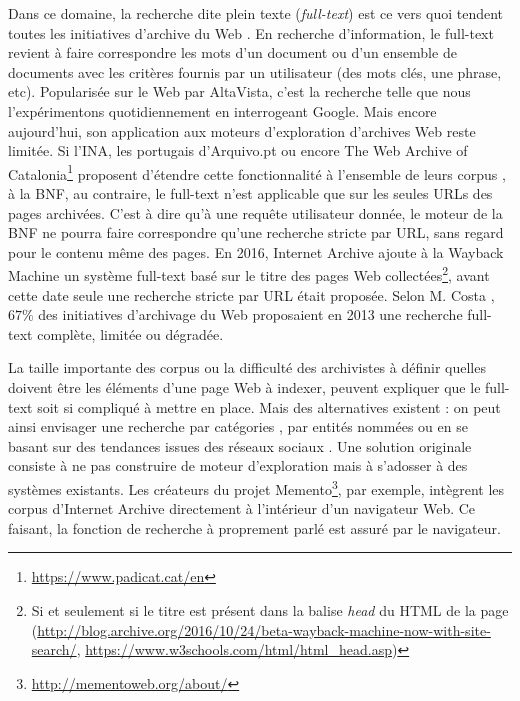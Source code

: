 \documentclass[symmetric,justified,marginals=raggedouter]{tufte-book}
\begin{document}
Dans ce domaine, la recherche dite plein texte (\textit{full-text}) est ce vers quoi tendent toutes les initiatives d'archive du Web \citep{costa_characterizing_2011,costa_evaluating_2012}. En recherche d'information, le full-text revient à faire correspondre les mots d'un document ou d'un ensemble de documents avec les critères fournis par un utilisateur (des mots clés, une phrase, etc). Popularisée sur le Web par AltaVista, c'est la recherche telle que nous l'expérimentons quotidiennement en interrogeant Google. Mais encore aujourd'hui, son application aux moteurs d'exploration d'archives Web reste limitée. Si l'INA, les portugais d'Arquivo.pt ou encore The Web Archive of Catalonia\footnote{\url{https://www.padicat.cat/en}} proposent d'étendre cette fonctionnalité à l'ensemble de leurs corpus \citep{stack_full_2006}, à la BNF, au contraire, le full-text n'est applicable que sur les seules URLs des pages archivées. C'est à dire qu'à une requête utilisateur donnée, le moteur de la BNF ne pourra faire correspondre qu'une recherche stricte par URL, sans regard pour le contenu même des pages. En 2016, Internet Archive ajoute à la Wayback Machine un système full-text basé sur le titre des pages Web collectées\footnote{Si et seulement si le titre est présent dans la balise \textit{head} du HTML de la page (\url{http://blog.archive.org/2016/10/24/beta-wayback-machine-now-with-site-search/}, \url{https://www.w3schools.com/html/html_head.asp})}, avant cette date seule une recherche stricte par URL était proposée. Selon M. Costa \citep{costa_survey_2013}, $67\%$ des initiatives d'archivage du Web proposaient en 2013 une recherche full-text complète, limitée ou dégradée. 

La taille importante des corpus ou la difficulté des archivistes à définir quelles doivent être les éléments d'une page Web à indexer, peuvent expliquer que le full-text soit si compliqué à mettre en place. Mais des alternatives existent : on peut ainsi envisager une recherche par catégories \citep{holzmann_tempas:_2016}, par entités nommées \citep{spaniol_tracking_2012} ou en se basant sur des tendances issues des réseaux sociaux \citep{risse_arcomem_2014}. Une solution originale consiste à ne pas construire de moteur d'exploration mais à s'adosser à des systèmes existants. Les créateurs du projet Memento\footnote{\url{http://mementoweb.org/about/}}, par exemple, intègrent les corpus d'Internet Archive directement à l'intérieur d'un navigateur Web. Ce faisant, la fonction de recherche à proprement parlé est assuré par le navigateur. 
\end{document}
